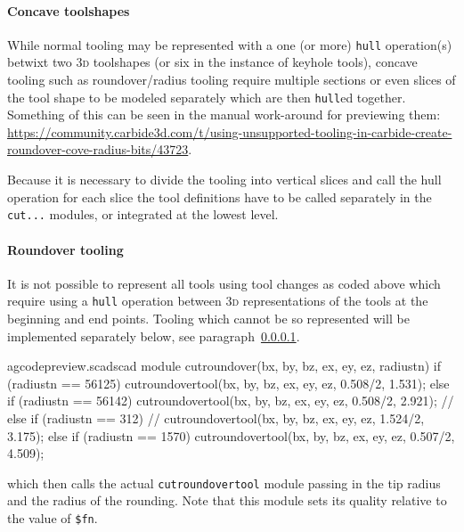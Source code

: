 \documentclass{ltxdoc}
\begin{document}
\paragraph{Concave toolshapes}
\label{para:concavetoolshapes} 
While normal tooling may be represented with a one (or more) \texttt{hull} operation(s) betwixt two \textsc{3d} toolshapes (or six in the instance of keyhole tools), concave tooling such as roundover/radius tooling require multiple sections or even slices of the tool shape to be modeled separately which are then \texttt{hull}ed together. Something of this can be seen in the manual work-around for previewing them: \url{https://community.carbide3d.com/t/using-unsupported-tooling-in-carbide-create-roundover-cove-radius-bits/43723}.

Because it is necessary to divide the tooling into vertical slices and call the hull operation for each slice the tool definitions have to be called separately in the \verb|cut...| modules, or integrated at the lowest level.


\paragraph{Roundover tooling}

\label{para:roundover} It is not possible to represent all tools using tool changes as coded above which require using a \texttt{hull} operation between \textsc{3d} representations of the tools at the beginning and end points. Tooling which cannot be so represented will be implemented separately below, see paragraph~\ref{para:concavetoolshapes}.

\lstset{firstnumber=\thegcpscad}
\begin{writecode}{a}{gcodepreview.scad}{scad}
module cutroundover(bx, by, bz, ex, ey, ez, radiustn) {
    if (radiustn == 56125) {
        cutroundovertool(bx, by, bz, ex, ey, ez, 0.508/2, 1.531);
    } else if (radiustn == 56142) {
        cutroundovertool(bx, by, bz, ex, ey, ez, 0.508/2, 2.921);
//    } else if (radiustn == 312) {
//        cutroundovertool(bx, by, bz, ex, ey, ez, 1.524/2, 3.175);
    } else if (radiustn == 1570) {
        cutroundovertool(bx, by, bz, ex, ey, ez, 0.507/2, 4.509);
    }
}

\end{writecode}
\addtocounter{gcpscad}{12}

\noindent which then calls the actual \texttt{cutroundovertool} module passing in the tip radius and the radius of the rounding. Note that this module sets its quality relative to the value of \verb|$fn|.
\end{document}
